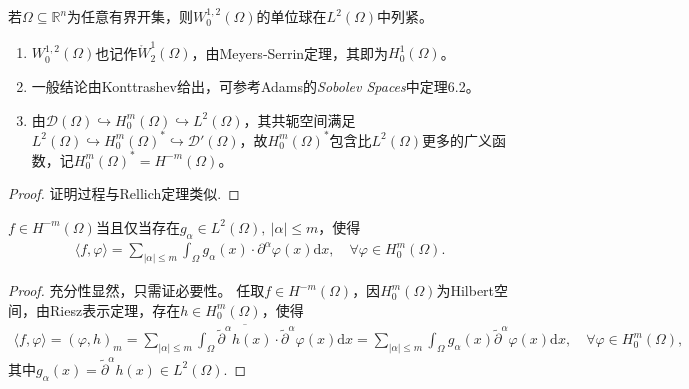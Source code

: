 \documentclass[../../main.tex]{subfiles}%
\begin{document}
\begin{corollary}
若$\Omega\subseteq\mathbb{R}^{n}$为任意有界开集，则$W_{0}^{1,2}(\Omega)$的单位球在$L^{2}(\Omega)$中列紧。
\end{corollary}
\begin{remark}
\begin{enumerate}[(1)]
\item $W_{0}^{1,2}(\Omega)$也记作$\mathring{W}_{2}^{1}(\Omega)$，由Meyers‑Serrin定理，其即为$H_{0}^{1}(\Omega)$。

\item 一般结论由Konttrashev给出，可参考Adams的\textit{Sobolev Spaces}中定理6.2。

\item 由$\mathscr{D}(\Omega)\hookrightarrow H_{0}^{m}(\Omega)\hookrightarrow L^{2}(\Omega)$，其共轭空间满足$L^{2}(\Omega)\hookrightarrow H_{0}^{m}(\Omega)^{*}\hookrightarrow\mathscr{D}'(\Omega)$，故$H_{0}^{m}(\Omega)^{*}$包含比$L^{2}(\Omega)$更多的广义函数，记$H_{0}^{m}(\Omega)^{*}=H^{-m}(\Omega)$。
\end{enumerate}
\end{remark}
\begin{proof}

证明过程与Rellich定理类似.

\end{proof}



\begin{theorem}
$f\in H^{-m}(\Omega)$当且仅当存在$g_{\alpha}\in L^{2}(\Omega),\ |\alpha|\leqslant m$，使得
\begin{align*}
\langle f,\varphi\rangle=\sum\limits_{|\alpha|\leqslant m}\int_{\Omega}g_{\alpha}(x)\cdot\partial^{\alpha}\varphi(x)\mathrm{d}x,\quad \forall\varphi\in H_{0}^{m}(\Omega).
\end{align*}
\end{theorem}

\begin{proof}

充分性显然，只需证必要性。
任取$f\in H^{-m}(\Omega)$，因$H_{0}^{m}(\Omega)$为Hilbert空间，由Riesz表示定理，存在$h\in H_{0}^{m}(\Omega)$，使得
\begin{align}
\langle f,\varphi\rangle=(\varphi,h)_{m}=\sum\limits_{|\alpha|\leqslant m}\int_{\Omega}\overline{\widetilde{\partial}^{\alpha}h(x)}\cdot\widetilde{\partial}^{\alpha}\varphi(x)\mathrm{d}x=\sum\limits_{|\alpha|\leqslant m}\int_{\Omega}g_{\alpha}(x)\widetilde{\partial}^{\alpha}\varphi(x)\mathrm{d}x,\quad \forall\varphi\in H_{0}^{m}(\Omega),\label{eq:riesz111}
\end{align}
其中$g_{\alpha}(x)=\widetilde{\partial}^{\alpha}h(x)\in L^{2}(\Omega)$.

\end{proof}
\end{document}
